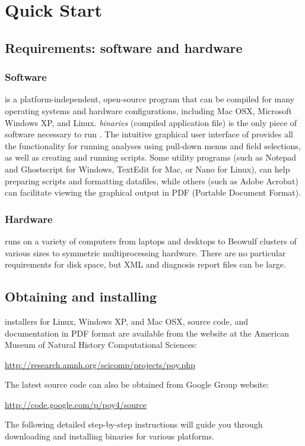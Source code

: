 \chapter{\poy Quick Start}

\section{Requirements: software and hardware}

\subsection{Software}
\poy is a platform-independent, open-source program that can be compiled for many operating systems  and hardware configurations, including Mac OSX, Microsoft Windows XP, and Linux. \poy \emph{binaries} (compiled application file) is the only piece of software necessary to run \poy. The intuitive graphical user interface of \poy provides all the functionality for running analyses using pull-down menus and field selections, as well as creating and running \poy scripts. Some utility programs (such as Notepad and Ghostscript for Windows, TextEdit for Mac, or Nano for Linux), can help preparing \poy scripts and formatting datafiles, while others (such as Adobe Acrobat) can facilitate viewing the graphical output in PDF (Portable Document Format).

\subsection{Hardware}
\poy runs on a variety of computers from laptops and desktops to Beowulf clusters 
of various sizes to symmetric multiprocessing hardware. There are no
particular requirements for disk space, but XML and diagnosis report files can be large.

\section{Obtaining and installing \poy}

\poy installers for Linux, Windows XP, and Mac OSX, source code, and documentation in PDF format are available from the \poy website at the American Museum of Natural History Computational Sciences:
\begin{center}
\url{http://research.amnh.org/scicomp/projects/poy.php}
\end{center}
The latest source code can also be obtained from \poy Google Group website:
\begin{center}
\url{http://code.google.com/p/poy4/source}
\end{center}
The following detailed step-by-step instructions will guide you through downloading and installing \poy binaries for various platforms.

